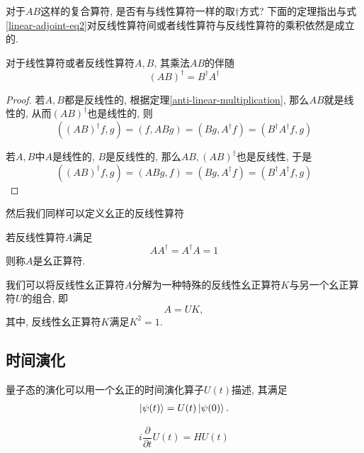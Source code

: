对于$AB$这样的复合算符, 是否有与线性算符一样的取$\dagger$方式? 下面的定理指出与式\eqref{linear-adjoint-eq2}对反线性算符间或者线性算符与反线性算符的乘积依然是成立的.
\begin{theorem}[反线性算符的复合]
    对于线性算符或者反线性算符$A, B$, 其乘法$AB$的伴随
    \begin{equation}
        (AB)^\dagger=B^\dagger A^\dagger
    \end{equation}
\end{theorem}
\begin{proof}
    若$A, B$都是反线性的, 根据定理\ref{anti-linear-multiplication}, 那么$AB$就是线性的, 从而$(AB)^\dagger$也是线性的, 则
    \begin{equation}
        ((AB)^\dagger f, g)=(f, ABg)=(Bg, A^\dagger f)=(B^\dagger A^\dagger f, g)
    \end{equation}
    
    若$A, B$中$A$是线性的, $B$是反线性的, 那么$AB, (AB)^\dagger$也是反线性, 于是
    \begin{equation}
        ((AB)^\dagger f, g)=(ABg, f)=(Bg, A^\dagger f)=(B^\dagger A^\dagger f, g)
    \end{equation}
\end{proof}

然后我们同样可以定义幺正的反线性算符
\begin{definition}[反线性幺正算符]
    若反线性算符$A$满足
    \begin{equation}
        AA^\dagger=A^\dagger A=1
    \end{equation}
    则称$A$是幺正算符.
\end{definition}

我们可以将反线性幺正算符$A$分解为一种特殊的反线性幺正算符$K$与另一个幺正算符$U$的组合, 即
\begin{equation}
    A=UK,
\end{equation}
其中, 反线性幺正算符$K$满足$K^2=1$.

\subsection{时间演化}
\begin{definition}[时间演化算子]
    量子态的演化可以用一个幺正的时间演化算子$U(t)$描述, 其满足
    \begin{align}
        \ket{\psi(t)}=U(t)\ket{\psi(0)}.
    \end{align}
\end{definition}
\begin{theorem}[Schrödinger方程]
    \begin{equation}
        i\frac{\partial}{\partial t}U(t)=HU(t)
    \end{equation}
\end{theorem}

